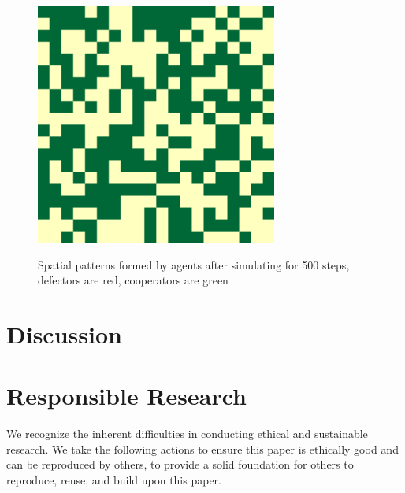 \documentclass[english]{article}
\begin{document}
\begin{figure}[!h]
{    \includegraphics[width=\textwidth/3]{spatial-memory1+gossip1+range3-C.pdf}
  }
  \caption{Spatial patterns formed by agents after simulating for 500 steps, defectors are red, cooperators are green}
  \label{fig:spatial}
\end{figure}




\section{Discussion}






\section{Responsible Research}
We recognize the inherent difficulties in conducting ethical and sustainable research.
We take the following actions to ensure this paper is ethically good
and can be reproduced by others, to provide a solid foundation for others to reproduce, reuse, and build upon this paper.
\end{document}
